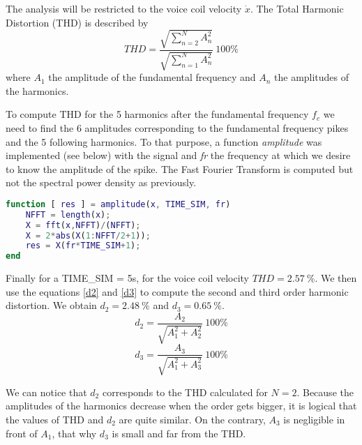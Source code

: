 The analysis will be restricted to the voice coil velocity $\dot{x}$. The Total Harmonic Distortion (THD) is described by
\begin{equation}
THD = \frac{\sqrt{\sum_{n=2}^{N}A_n^2}}{\sqrt{\sum_{n=1}^{N}A_n^2}} \ 100\%
\end{equation}
where $A_1$ the amplitude of the fundamental frequency and $A_n$ the amplitudes of the harmonics. 

To compute THD for the 5 harmonics after the fundamental frequency $f_c$ we need to find the 6 amplitudes corresponding to the fundamental frequency pikes and the 5 following harmonics. To that purpose, a function \textit{amplitude} was implemented (see below) with \textit{} the signal and \textit{fr} the frequency at which we desire to know the amplitude of the spike. The Fast Fourier Transform is computed but not the spectral power density as previously. 
\begin{lstlisting}[language=Matlab]
function [ res ] = amplitude(x, TIME_SIM, fr)
	NFFT = length(x);
	X = fft(x,NFFT)/(NFFT);	
	X = 2*abs(X(1:NFFT/2+1)); 
	res = X(fr*TIME_SIM+1);
end
\end{lstlisting}

Finally for a TIME\_SIM = 5s, for the voice coil velocity $THD = 2.57 \ \%$. 
We then use the equations \eqref{d2} and \eqref{d3} to compute the second and third order harmonic distortion. We obtain $d_2 = 2.48 \ \%$ and $d_3 = 0.65 \ \%$.
\begin{equation}
d_2 = \frac{A_2}{\sqrt{A_1^2 + A_2^2}} \ 100\%
\label{d2}
\end{equation}
\begin{equation}
d_3 = \frac{A_3}{\sqrt{A_1^2 + A_3^2}} \ 100\%
\label{d3}
\end{equation}

We can notice that $d_2$ corresponds to the THD calculated for $N=2$. Because the amplitudes of the harmonics decrease when the order gets bigger, it is logical that the values of THD and $d_2$ are quite similar. On the contrary, $A_3$ is negligible in front of $A_1$, that why $d_3$ is small and far from the THD. 
